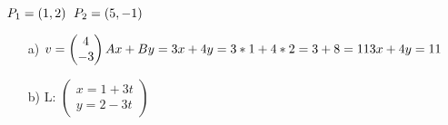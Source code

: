 \subsection{}
\begin{math}
    P_1=(1,2)
    \hspace{6px}
    P_2=(5,-1)
\end{math}
\begin{enumerate}
    \item[a)]
        \begin{math}
            v=\begin{pmatrix}
                4\\
                -3
            \end{pmatrix}
            \\
            Ax+By
            =3x+4y
            =3*1+4*2
            =3+8
            =11
            \\
            3x+4y=11
        \end{math}
    \item[b)]
        \begin{math}
            \text{L: }
            \begin{pmatrix}
                x=1+3t\\
                y=2-3t
            \end{pmatrix}
        \end{math}
\end{enumerate}